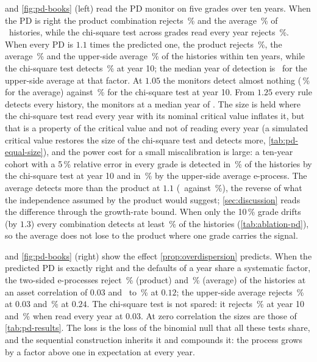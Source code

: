  and \cref{fig:pd-books} (left) read the PD monitor on five grades over ten years. When the PD is right the product combination rejects \nPdOneProd\,\% and the average \nPdOneAvg\,\% of \nPdReps\ histories, while the chi-square test across grades read every year rejects \nPdOneChiEvery\,\%. When every PD is $1.1$ times the predicted one, the product rejects \nPdOneOneProd\,\%, the average \nPdOneOneAvg\,\% and the upper-side average \nPdOneOneAvgUp\,\% of the histories within ten years, while the chi-square test detects \nPdOneOneChiOne\,\% at year 10;
the median year of detection is \nPdMedYearOneOne\ for the upper-side average at that factor. At $1.05$ the monitors detect almost nothing (\nPdOneZeroFiveAvg\,\% for the average) against \nPdOneZeroFiveChiOne\,\% for the chi-square test at year 10. From $1.25$ every rule detects every history, the monitors at a median year of \nPdMedYearOneTwoFive. The size is held where the chi-square test read every year with its nominal critical value inflates it, but that is a property of the critical value and not of reading every year (a simulated critical value restores the size of the chi-square test and detects more, \cref{tab:pd-equal-size}), and the power cost for a small miscalibration is large: a ten-year cohort with a 5\,\% relative error in every grade is detected in \nPdOneZeroFiveChiOne\,\% of the histories by the chi-square test at year 10 and in \nPdOneZeroFiveAvgUp\,\% by the upper-side average e-process. The average detects more than the product at $1.1$ (\nPdOneOneAvg\ against \nPdOneOneProd\,\%), the reverse of what the independence assumed by the product would suggest;
\cref{sec:discussion} reads the difference through the growth-rate bound. When only the 10\,\% grade drifts (by $1.3$) every combination detects at least \nPdGradeProdUp\,\% of the histories (\cref{tab:ablation-pd}), so the average does not lose to the product where one grade carries the signal.



 and \cref{fig:pd-books} (right) show the effect \cref{prop:overdispersion} predicts. When the predicted PD is exactly right and the defaults of a year share a systematic factor, the two-sided e-processes reject \nRhoZeroThreeProd\,\% (product) and \nRhoZeroThreeAvg\,\% (average) of the histories at an asset correlation of $0.03$ and \nRhoOneTwoProd\ to \nRhoOneTwoAvg\,\% at $0.12$; the upper-side average rejects \nRhoZeroThreeAvgUp\,\% at $0.03$ and \nRhoTwoFourAvgUp\,\% at $0.24$. The chi-square test is not spared: it rejects \nRhoZeroThreeChiOne\,\% at year 10 and \nRhoZeroThreeChiEvery\,\% when read every year at $0.03$. At zero
correlation the sizes are those of \cref{tab:pd-results}. The loss is the loss of the binomial null that all these tests share, and the sequential construction inherits it and compounds it: the process grows by a factor above one in expectation at every year.

